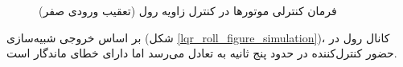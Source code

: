 \begin{figure}[H]
	\centering
	\caption{‫‪فرمان کنترلی موتورها در کنترل زاویه رول (تعقیب ورودی صفر)}
\end{figure}


بر اساس خروجی شبیه‌سازی (شکل
\ref{lqr_roll_figure_simulation})،
کانال رول در حضور کنترل‌کننده  در حدود پنج ثانیه به تعادل می‌رسد اما دارای خطای ماندگار است. 